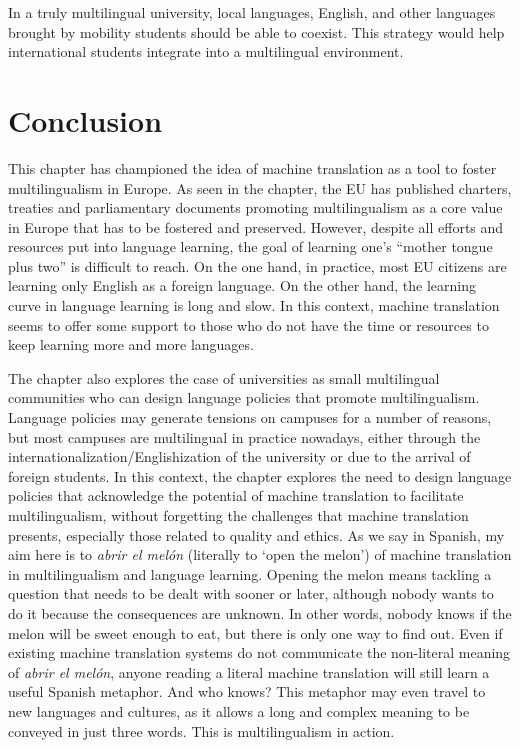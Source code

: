 \documentclass[output=paper]{langscibook}
\begin{document}
\begin{sloppypar}
In a truly multilingual university, local languages, English, and other languages brought by mobility students should be able to coexist. This strategy would help international students integrate into a multilingual environment. 
\end{sloppypar}

\section{Conclusion}\largerpage

This chapter has championed the idea of machine translation as a tool to foster multilingualism in Europe. As seen in the chapter, the EU has published charters, treaties and parliamentary documents promoting multilingualism as a core value in Europe that has to be fostered and preserved. However, despite all efforts and resources put into language learning, the goal of learning one’s “mother tongue plus two” is difficult to reach. On the one hand, in practice, most EU citizens are learning only English as a foreign language. On the other hand, the learning curve in language learning is long and slow. In this context, machine translation seems to offer some support to those who do not have the time or resources to keep learning more and more languages.

The chapter also explores the case of universities as small multilingual communities who can design language policies that promote multilingualism. Language policies may generate tensions on campuses for a number of reasons, but most campuses are multilingual in practice nowadays, either through the internationalization/Englishization of the university or due to the arrival of foreign students. In this context, the chapter explores the need to design language policies that acknowledge the potential of machine translation to facilitate multilingualism, without forgetting the challenges that machine translation presents, especially those related to quality and ethics. As we say in Spanish, my aim here is to \textit{abrir el melón} (literally to ‘open the melon’) of machine translation in multilingualism and language learning. Opening the melon means tackling a question that needs to be dealt with sooner or later, although nobody wants to do it because the consequences are unknown. In other words, nobody knows if the melon will be sweet enough to eat, but there is only one way to find out. Even if existing machine translation systems do not communicate the non-literal meaning of \textit{abrir el melón}, anyone reading a literal machine translation will still learn a useful Spanish metaphor. And who knows? This metaphor may even travel to new languages and cultures, as it allows a long and complex meaning to be conveyed in just three words. This is multilingualism in action.\largerpage

\printbibliography[heading=subbibliography,notkeyword=this]
\end{document}
